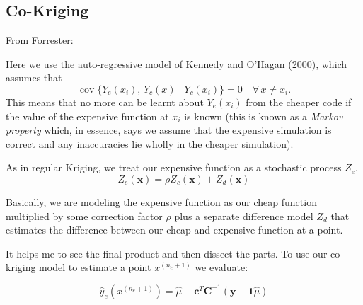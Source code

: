 \documentclass[11pt]{article}
\newcommand{\subentry}[1]{\subsection{#1}}
\theoremstyle{definition}
\begin{document}
\subentry{Co-Kriging}
From Forrester:
\begin{displayquote}[Forrester et al., 2008]
  Here we use the auto-regressive model of Kennedy and O'Hagan (2000), which
  assumes that
  \begin{equation*}
    \operatorname{cov}\{Y_e(x_i),\, Y_c(x) \mid Y_c(x_i)\} = 0
    \quad \forall\, x \neq x_i.
  \end{equation*}
  This means that no more can be learnt about $Y_e(x_i)$ from the cheaper code if
  the value of the expensive function at $x_i$ is known (this is known as a
  \emph{Markov property} which, in essence, says we assume that the expensive
  simulation is correct and any inaccuracies lie wholly in the cheaper
  simulation).
\end{displayquote}
As in regular Kriging, we treat our expensive function as a stochastic process $Z_e$,
\begin{equation}
  Z_e(\mathbf{x}) = \rho Z_c(\mathbf{x}) + Z_d(\mathbf{x})
  \label{eq:co-kriging}
\end{equation}

Basically, we are modeling the expensive function as our cheap function multiplied by some
correction factor $\rho$ plus a separate difference model $Z_d$ that estimates the difference
between our cheap and expensive function at a point.

It helps me to see the final product and then dissect the parts. To use our co-kriging model to estimate
a point $x^{(n_e + 1)}$ we evaluate:

\begin{equation}
  \hat{y}_e\!\left(x^{(n_e+1)}\right)
    = \hat{\mu} + \mathbf{c}^T \mathbf{C}^{-1}\left(\mathbf{y} - \mathbf{1}\hat{\mu}\right)
  \label{eq:co-kriging-evaluate}
\end{equation}
\end{document}
